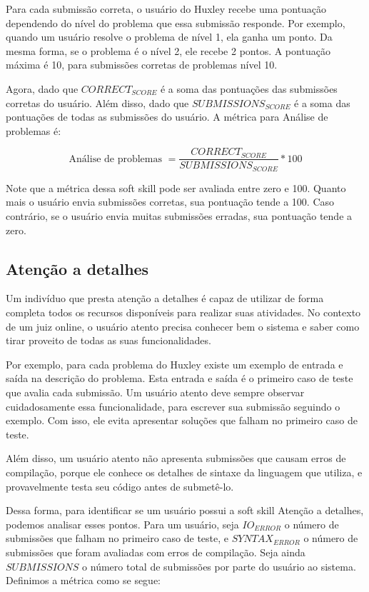 Para cada submissão correta, o usuário do Huxley recebe uma pontuação dependendo do nível do problema que essa submissão responde. Por exemplo, quando um usuário resolve o problema de nível 1, ela ganha um ponto. Da mesma forma, se o problema é o nível 2, ele recebe 2 pontos. A pontuação máxima é 10, para submissões corretas de problemas nível 10.

Agora, dado que $CORRECT_{SCORE}$ é a soma das pontuações das submissões corretas do usuário. Além disso, dado que $SUBMISSIONS_{SCORE}$ é a soma das pontuações de todas as submissões do usuário. A métrica para Análise de problemas é:

\begin{equation} \label{m:analise}
\mbox{Análise de problemas } = \frac{CORRECT_{SCORE}}{SUBMISSIONS_{SCORE}} * 100
\end{equation}

Note que a métrica dessa soft skill pode ser avaliada entre zero e 100. Quanto mais o usuário envia submissões corretas, sua pontuação tende a 100. Caso contrário, se o usuário envia muitas submissões erradas, sua pontuação tende a zero.

\subsection{Atenção a detalhes}

Um indivíduo que presta atenção a detalhes é capaz de utilizar de forma completa todos os recursos disponíveis para realizar suas atividades. No contexto de um juiz online, o usuário atento precisa conhecer bem o sistema e saber como tirar proveito de todas as suas funcionalidades.

Por exemplo, para cada problema do Huxley existe um exemplo de entrada e saída na descrição do problema. Esta entrada e saída é o primeiro caso de teste que avalia cada submissão. Um usuário atento deve sempre observar cuidadosamente essa funcionalidade, para escrever sua submissão seguindo o exemplo. Com isso, ele evita apresentar soluções que falham no primeiro caso de teste.

Além disso, um usuário atento não apresenta submissões que causam erros de compilação, porque ele conhece os detalhes de sintaxe da linguagem que utiliza, e provavelmente testa seu código antes de submetê-lo.

Dessa forma, para identificar se um usuário possui a soft skill Atenção a detalhes, podemos analisar esses pontos. Para um usuário, seja $IO_{ERROR}$ o número de submissões que falham no primeiro caso de teste, e $SYNTAX_{ERROR}$ o número de submissões que foram avaliadas com erros de compilação. Seja ainda $SUBMISSIONS$ o número total de submissões por parte do usuário ao sistema. Definimos a métrica como se segue:

